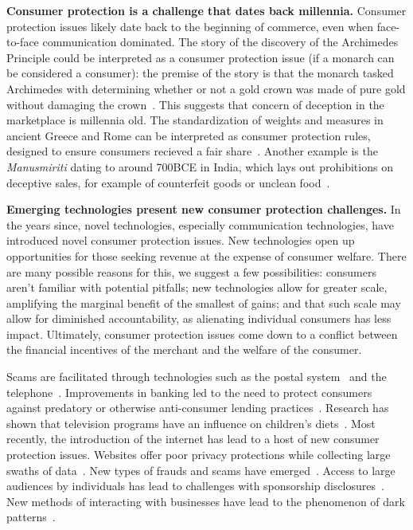 \textbf{Consumer protection is a challenge that dates back millennia.}
Consumer protection issues likely date back to the beginning of commerce, even when face-to-face communication dominated. The story of the discovery of the Archimedes Principle could be interpreted as a consumer protection issue (if a monarch can be considered a consumer): the premise of the story is that the monarch tasked Archimedes with determining whether or not a gold crown was made of pure gold without damaging the crown~\cite{thompson2008archimedes}. This suggests that concern of deception in the marketplace is millennia old.  The standardization of weights and measures in ancient Greece and Rome can be interpreted as consumer protection rules, designed to ensure consumers recieved a fair share~\cite{smither2017roman}. Another example is the \textit{Manusmiriti} dating to around 700BCE in India, which lays out prohibitions on deceptive sales, for example of counterfeit goods or unclean food~\cite{devi2016legal}.

\textbf{Emerging technologies present new consumer protection challenges.}
In the years since, novel technologies, especially communication technologies, have introduced novel consumer protection issues. New technologies open up opportunities for those seeking revenue at the expense of consumer welfare. There are many possible reasons for this, we suggest a few possibilities: consumers aren't familiar with potential pitfalls; new technologies allow for greater scale, amplifying the marginal benefit of the smallest of gains; and that such scale may allow for diminished accountability, as alienating individual consumers has less impact. Ultimately, consumer protection issues come down to a conflict between the financial incentives of the merchant and the welfare of the consumer.

Scams are facilitated through technologies such as the postal system~\cite{uspismailfraud} and the telephone~\cite{ftcphonescams}. Improvements in banking led to the need to protect consumers against predatory or otherwise anti-consumer lending practices~\cite{eaglesham2011warning,doddfrank}. Research has shown that television programs have an influence on children's diets~\cite{morton1985television}. Most recently, the introduction of the internet has lead to a host of new consumer protection issues. Websites offer poor privacy protections while collecting large swaths of data~\cite{estrada2017online}. New types of frauds and scams have emerged~\cite{ftcscamalerts}. Access to large audiences by individuals has lead to challenges with sponsorship disclosures~\cite{ftc2021disclosures}. New methods of interacting with businesses have lead to the phenomenon of dark patterns~\cite{darkpatternsorg}.

